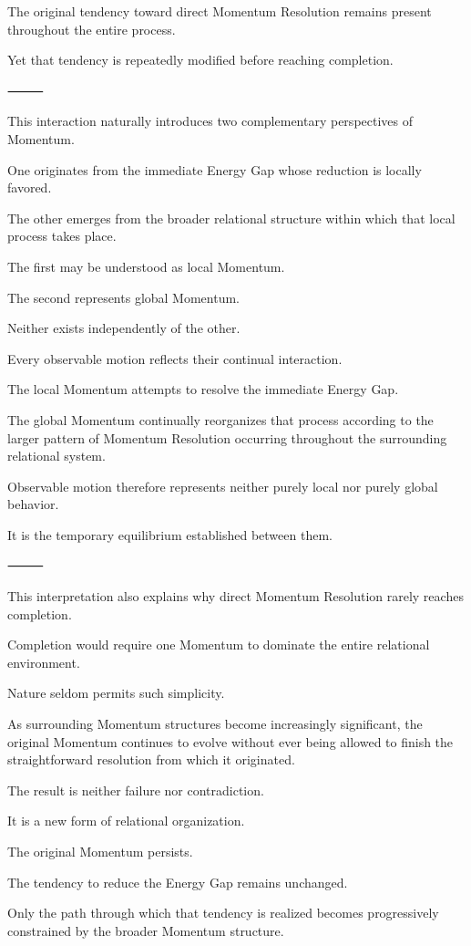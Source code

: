 The original tendency toward direct Momentum Resolution remains present throughout the entire process.

Yet that tendency is repeatedly modified before reaching completion.

⸻

This interaction naturally introduces two complementary perspectives of Momentum.

One originates from the immediate Energy Gap whose reduction is locally favored.

The other emerges from the broader relational structure within which that local process takes place.

The first may be understood as local Momentum.

The second represents global Momentum.

Neither exists independently of the other.

Every observable motion reflects their continual interaction.

The local Momentum attempts to resolve the immediate Energy Gap.

The global Momentum continually reorganizes that process according to the larger pattern of Momentum Resolution occurring throughout the surrounding relational system.

Observable motion therefore represents neither purely local nor purely global behavior.

It is the temporary equilibrium established between them.

⸻

This interpretation also explains why direct Momentum Resolution rarely reaches completion.

Completion would require one Momentum to dominate the entire relational environment.

Nature seldom permits such simplicity.

As surrounding Momentum structures become increasingly significant, the original Momentum continues to evolve without ever being allowed to finish the straightforward resolution from which it originated.

The result is neither failure nor contradiction.

It is a new form of relational organization.

The original Momentum persists.

The tendency to reduce the Energy Gap remains unchanged.

Only the path through which that tendency is realized becomes progressively constrained by the broader Momentum structure.

